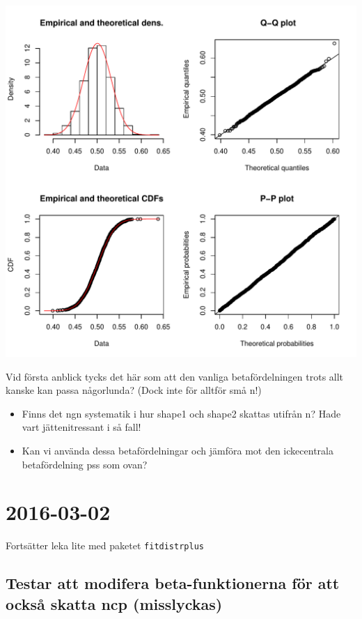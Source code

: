 \documentclass[]{article}
\providecommand{\tightlist}{%
  \setlength{\itemsep}{0pt}\setlength{\parskip}{0pt}}
\begin{document}
\includegraphics{2016_w09_files/figure-latex/unnamed-chunk-9-12.pdf}

Vid första anblick tycks det här som att den vanliga betafördelningen
trots allt kanske kan passa någorlunda? (Dock inte för alltför små n!)

\begin{itemize}
\tightlist
\item
  Finns det ngn systematik i hur shape1 och shape2 skattas utifrån n?
  Hade vart jättenitressant i så fall!
\item
  Kan vi använda dessa betafördelningar och jämföra mot den ickecentrala
  betafördelning pss som ovan?
\end{itemize}

\section{2016-03-02}\label{section-2}

Fortsätter leka lite med paketet \texttt{fitdistrplus}

\subsection{Testar att modifera beta-funktionerna för att också skatta
ncp
(misslyckas)}\label{testar-att-modifera-beta-funktionerna-for-att-ocksa-skatta-ncp-misslyckas}
\end{document}

